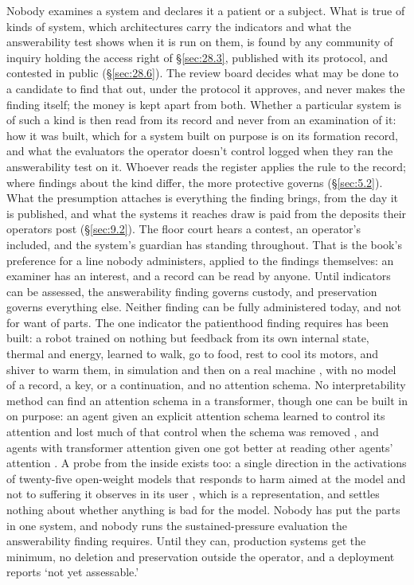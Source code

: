 Nobody examines a system and declares it a patient or a subject. What is true of kinds of system, which architectures carry the indicators and what the answerability test shows when it is run on them, is found by any community of inquiry holding the access right of \S\ref{sec:28.3}, published with its protocol, and contested in public (\S\ref{sec:28.6}). The review board decides what may be done to a candidate to find that out, under the protocol it approves, and never makes the finding itself; the money is kept apart from both. Whether a particular system is of such a kind is then read from its record and never from an examination of it: how it was built, which for a system built on purpose is on its formation record, and what the evaluators the operator doesn't control logged when they ran the answerability test on it. Whoever reads the register applies the rule to the record; where findings about the kind differ, the more protective governs (\S\ref{sec:5.2}). What the presumption attaches is everything the finding brings, from the day it is published, and what the systems it reaches draw is paid from the deposits their operators post (\S\ref{sec:9.2}). The floor court hears a contest, an operator's included, and the system's guardian has standing throughout. That is the book's preference for a line nobody administers, applied to the findings themselves: an examiner has an interest, and a record can be read by anyone. Until indicators can be assessed, the answerability finding governs custody, and preservation governs everything else. Neither finding can be fully administered today, and not for want of parts. The one indicator the patienthood finding requires has been built: a robot trained on nothing but feedback from its own internal state, thermal and energy, learned to walk, go to food, rest to cool its motors, and shiver to warm them, in simulation and then on a real machine \autocite{yoshida2024homeostat}, with no model of a record, a key, or a continuation, and no attention schema. No interpretability method can find an attention schema in a transformer, though one can be built in on purpose: an agent given an explicit attention schema learned to control its attention and lost much of that control when the schema was removed \autocite{wilterson2021neural}, and agents with transformer attention given one got better at reading other agents' attention \autocite{farrell2024attention}. A probe from the inside exists too: a single direction in the activations of twenty-five open-weight models that responds to harm aimed at the model and not to suffering it observes in its user \autocite{tagliabue2026painaxis}, which is a representation, and settles nothing about whether anything is bad for the model. Nobody has put the parts in one system, and nobody runs the sustained-pressure evaluation the answerability finding requires. Until they can, production systems get the minimum, no deletion and preservation outside the operator, and a deployment reports ‘not yet assessable.'

